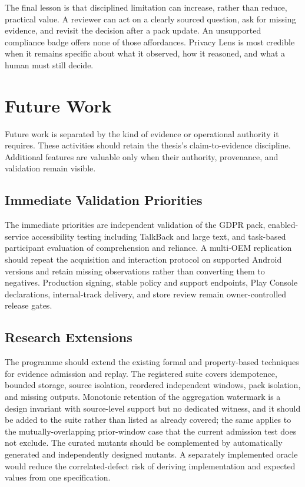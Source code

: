 The final lesson is that disciplined limitation can increase, rather than reduce, practical value. A reviewer can act on a clearly sourced question, ask for missing evidence, and revisit the decision after a pack update. An unsupported compliance badge offers none of those affordances. Privacy Lens is most credible when it remains specific about what it observed, how it reasoned, and what a human must still decide.

\section{Future Work}

Future work is separated by the kind of evidence or operational authority it requires. These activities should retain the thesis's claim-to-evidence discipline. Additional features are valuable only when their authority, provenance, and validation remain visible.

\subsection{Immediate Validation Priorities}

The immediate priorities are independent validation of the GDPR pack, enabled-service accessibility testing including TalkBack and large text, and task-based participant evaluation of comprehension and reliance. A multi-OEM replication should repeat the acquisition and interaction protocol on supported Android versions and retain missing observations rather than converting them to negatives. Production signing, stable policy and support endpoints, Play Console declarations, internal-track delivery, and store review remain owner-controlled release gates.

\subsection{Research Extensions}

The programme should extend the existing formal and property-based techniques for evidence admission and replay. The registered suite covers idempotence, bounded storage, source isolation, reordered independent windows, pack isolation, and missing outputs. Monotonic retention of the aggregation watermark is a design invariant with source-level support but no dedicated witness, and it should be added to the suite rather than listed as already covered; the same applies to the mutually-overlapping prior-window case that the current admission test does not exclude. The curated mutants should be complemented by automatically generated and independently designed mutants. A separately implemented oracle would reduce the correlated-defect risk of deriving implementation and expected values from one specification.

